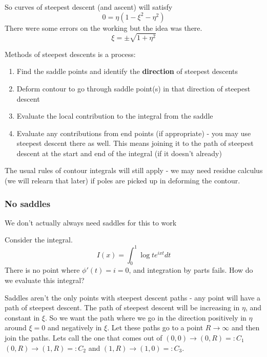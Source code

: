 \documentclass{X:/Documents/Coding/Latex/myassignment}
\begin{document}
So curves of steepest descent (and ascent) will satisfy 
\[0 = \eta(1-\xi^2 -\eta^2)\]
There were some errors on the working but the idea was there.
\[\xi  =\pm \sqrt{1 + \eta^2} \]



Methods of steepest descents is a process:
\begin{enumerate}
    \item Find the saddle points and identify the \textbf{direction} of steepest descents
    \item Deform contour to go through saddle point(s) in that direction of steepest descent
    \item Evaluate the local contribution to the integral from the saddle
    \item Evaluate any contributions from end points (if appropriate) - you may use steepest descent there as well. This means joining it to the path of steepest descent at the start and end of the integral (if it doesn't already)
\end{enumerate}
The usual rules of contour integrals will still apply - we may need residue calculus (we will relearn that later) if poles are picked up in deforming the contour.

\subsubsection{No saddles}
We don't actually always need saddles for this to work

Consider the integral.
\[I(x) = \int_0^1 \log t e^{ixt} dt\]
There is no point where $\phi'(t) = i = 0$, and integration by parts fails. How do we evaluate this integral?

Saddles aren't the only points with steepest descent paths - any point will have a path of steepest descent. 
The path of steepest descent will be increasing in $\eta$, and constant in $\xi$. So we want the path where we go in the direction positively in $\eta$ around $\xi =0$ and negatively in $\xi$. Let these paths go to a point $R\to \infty$ and then join the paths. 
Lets call the one that comes out of $(0,0) \to (0,R) =: C_1$ $(0,R)\to(1,R) =: C_2$ and $(1,R) \to (1,0) = : C_3$.
\end{document}

